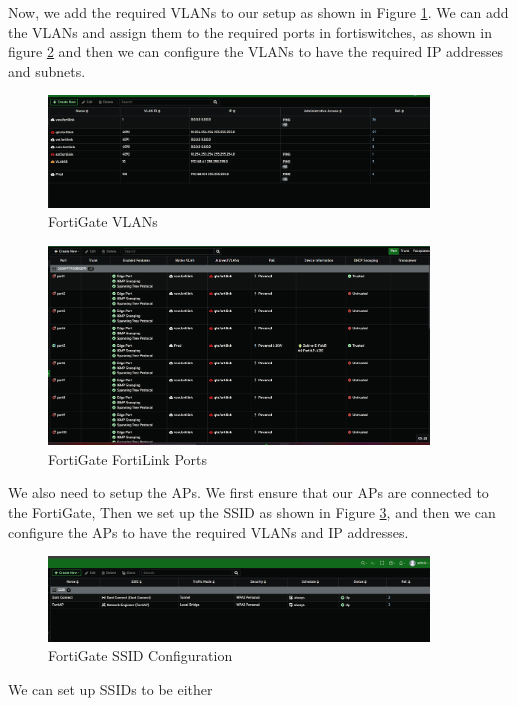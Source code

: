 \documentclass[12pt]{report}
\begin{document}
Now, we add the required VLANs to our setup as shown in Figure \ref{fig:flvlans}. We can add the VLANs and assign them to the required ports in fortiswitches, as shown in figure \ref{fig:flports2} and then we can configure the VLANs to have the required IP addresses and subnets.
\begin{figure}
    \centering
    \includegraphics[width=0.9\textwidth]{images/Implementation/flvlans.png}
    \caption{FortiGate VLANs}
    \label{fig:flvlans}
\end{figure}
\begin{figure}
    \centering
    \includegraphics[width=0.9\textwidth]{images/Implementation/flports2.png}
    \caption{FortiGate FortiLink Ports}
    \label{fig:flports2}
\end{figure}
We also need to setup the APs. 
We first ensure that our APs are connected to the FortiGate, Then we set up the SSID as shown in Figure \ref{fig:ssid}, and then we can configure the APs to have the required VLANs and IP addresses.
\begin{figure}
    \centering
    \includegraphics[width=0.9\textwidth]{images/Implementation/ssid.png}
    \caption{FortiGate SSID Configuration}
    \label{fig:ssid}
\end{figure}
We can set up SSIDs to be either 
\end{document}

